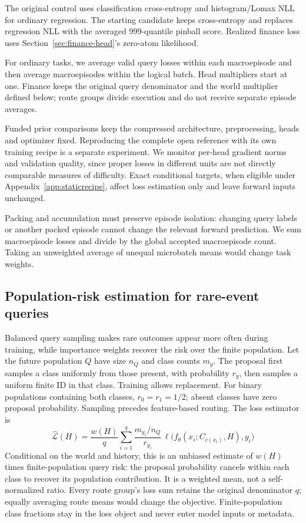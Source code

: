 \documentclass[11pt]{article}
\begin{document}
The original control uses classification cross-entropy and histogram/Lomax NLL for ordinary regression. The starting candidate keeps cross-entropy and replaces regression NLL with the averaged 999-quantile pinball score. Realized finance loss uses Section~\ref{sec:finance-head}'s zero-atom likelihood.

For ordinary tasks, we average valid query losses within each macroepisode and then average macroepisodes within the logical batch. Head multipliers start at one. Finance keeps the original query denominator and the world multiplier defined below; route groups divide execution and do not receive separate episode averages.

Funded prior comparisons keep the compressed architecture, preprocessing, heads and optimizer fixed. Reproducing the complete open reference with its own training recipe is a separate experiment. We monitor per-head gradient norms and validation quality, since proper losses in different units are not directly comparable measures of difficulty. Exact conditional targets, when eligible under Appendix~\ref{app:staticrecipe}, affect loss estimation only and leave forward inputs unchanged.

Packing and accumulation must preserve episode isolation: changing query labels or another packed episode cannot change the relevant forward prediction. We sum macroepisode losses and divide by the global accepted macroepisode count. Taking an unweighted average of unequal microbatch means would change task weights.

\subsection{Population-risk estimation for rare-event queries}
\label{sec:finance-objective}

Balanced query sampling makes rare outcomes appear more often during training, while importance weights recover the risk over the finite population. Let the future population $Q$ have size $n_Q$ and class counts $m_y$. The proposal first samples a class uniformly from those present, with probability $r_y$, then samples a uniform finite ID in that class. Training allows replacement. For binary populations containing both classes, $r_0=r_1=1/2$; absent classes have zero proposal probability. Sampling precedes feature-based routing. The loss estimator is
\begin{equation}
\widehat{\mathcal L}(H)=\frac{w(H)}{q}\sum_{i=1}^{q}
\frac{m_{y_i}/n_Q}{r_{y_i}}\,\ell\bigl(f_\theta(x_i;C_{c(x_i)},H),y_i\bigr)
\label{eq:finance-risk}
\end{equation}
Conditional on the world and history, this is an unbiased estimate of $w(H)$ times finite-population query risk: the proposal probability cancels within each class to recover its population contribution. It is a weighted mean, not a self-normalized ratio. Every route group's loss sum retains the original denominator $q$; equally averaging route means would change the objective. Finite-population class fractions stay in the loss object and never enter model inputs or metadata.
\end{document}
